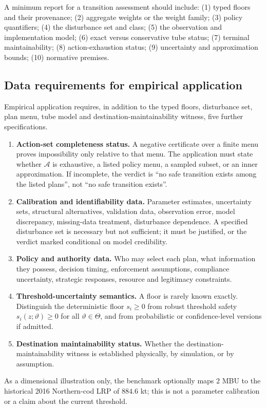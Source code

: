 A minimum report for a transition assessment should include: (1) typed floors and their provenance; (2) aggregate weights or the weight family; (3) policy quantifiers; (4) the disturbance set and class; (5) the observation and implementation model; (6) exact versus conservative tube status; (7) terminal maintainability; (8) action-exhaustion status; (9) uncertainty and approximation bounds; (10) normative premises.

\subsection{Data requirements for empirical application}

Empirical application requires, in addition to the typed floors, disturbance set, plan menu, tube model and destination-maintainability witness, five further specifications.
\begin{enumerate}[leftmargin=2em]
\item \textbf{Action-set completeness status.} A negative certificate over a finite menu proves impossibility only relative to that menu. The application must state whether $\mathcal A$ is exhaustive, a listed policy menu, a sampled subset, or an inner approximation. If incomplete, the verdict is ``no safe transition exists among the listed plans'', not ``no safe transition exists''.
\item \textbf{Calibration and identifiability data.} Parameter estimates, uncertainty sets, structural alternatives, validation data, observation error, model discrepancy, missing-data treatment, disturbance dependence. A specified disturbance set is necessary but not sufficient; it must be justified, or the verdict marked conditional on model credibility.
\item \textbf{Policy and authority data.} Who may select each plan, what information they possess, decision timing, enforcement assumptions, compliance uncertainty, strategic responses, resource and legitimacy constraints.
\item \textbf{Threshold-uncertainty semantics.} A floor is rarely known exactly. Distinguish the deterministic floor $s_i\ge0$ from robust threshold safety $s_i(z;\vartheta)\ge0$ for all $\vartheta\in\Theta$, and from probabilistic or confidence-level versions if admitted.
\item \textbf{Destination maintainability status.} Whether the destination-maintainability witness is established physically, by simulation, or by assumption.
\end{enumerate}
As a dimensional illustration only, the benchmark optionally maps $2$ MBU to the historical 2016 Northern-cod LRP of $884.6$ kt; this is not a parameter calibration or a claim about the current threshold.

